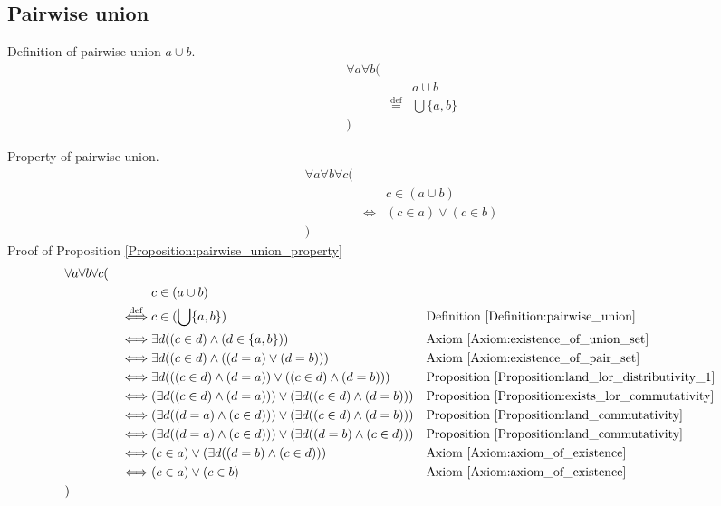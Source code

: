 \subsection{Pairwise union}
\begin{defn}
\label{Definition:pairwise_union}
Definition of pairwise union $a \cup b$.
\begin{align*}
& \forall a \forall b ( \\
& & & a \cup b \\
& & \overset{\operatorname{def}}{=} & \bigcup \{ a , b \} \\
& )
\end{align*}
\end{defn}

\begin{prop}
\label{Proposition:pairwise_union_property}
Property of pairwise union.
\begin{align*}
& \forall a \forall b \forall c ( \\
& & & c \in (a \cup b) \\
& & \iff & (c \in a) \lor (c \in b) \\
& )
\end{align*}
Proof of Proposition \ref{Proposition:pairwise_union_property}
\begin{align*}
& \forall a \forall b \forall c ( \\
& & & c \in (a \cup b) \\
& & \overset{\operatorname{def}}{\iff} & c \in (\bigcup \{ a , b \})
& & \text{Definition \ref{Definition:pairwise_union}} \\
& & \iff & \exists d ((c \in d) \land (d \in \{ a , b \}))
& & \text{Axiom \ref{Axiom:existence_of_union_set}} \\
& & \iff & \exists d ((c \in d) \land ((d = a) \lor (d = b)))
& & \text{Axiom \ref{Axiom:existence_of_pair_set}} \\
& & \iff & \exists d (((c \in d) \land (d = a)) \lor ((c \in d) \land (d = b)))
& & \text{Proposition \ref{Proposition:land_lor_distributivity_1}} \\
& & \iff & (\exists d ((c \in d) \land (d = a))) \lor (\exists d ((c \in d) \land (d = b)))
& & \text{Proposition \ref{Proposition:exists_lor_commutativity}} \\
& & \iff & (\exists d ((d = a) \land (c \in d))) \lor (\exists d ((c \in d) \land (d = b)))
& & \text{Proposition \ref{Proposition:land_commutativity}} \\
& & \iff & (\exists d ((d = a) \land (c \in d))) \lor (\exists d ((d = b) \land (c \in d)))
& & \text{Proposition \ref{Proposition:land_commutativity}} \\
& & \iff & (c \in a) \lor (\exists d ((d = b) \land (c \in d)))
& & \text{Axiom \ref{Axiom:axiom_of_existence}} \\
& & \iff & (c \in a) \lor (c \in b)
& & \text{Axiom \ref{Axiom:axiom_of_existence}} \\
& )
\end{align*}
\end{prop}

